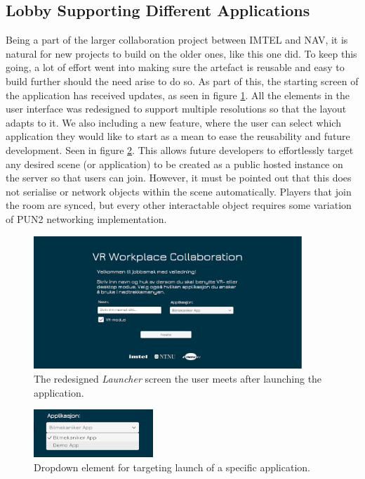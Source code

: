 \subsection{Lobby Supporting Different Applications}
\label{section:lobbySystem}
Being a part of the larger collaboration project between IMTEL and NAV, it is natural for new projects to build on the older ones, like this one did. To keep this going, a lot of effort went into making sure the artefact is reusable and easy to build further should the need arise to do so. As part of this, the starting screen of the application has received updates, as seen in figure \ref{fig:phase3_lobby1}. All the elements in the user interface was redesigned to support multiple resolutions so that the layout adapts to it.  
We also including a new feature, where the user can select which application they would like to start as a mean to ease the reusability and future development. Seen in figure \ref{fig:phase3_dropwdown}. This allows future developers to effortlessly target any desired scene (or application) to be created as a public hosted instance on the server so that users can join. 
However, it must be pointed out that this does not serialise or network objects within the scene automatically. Players that join the room are synced, but every other interactable object requires some variation of PUN2 networking implementation. 
    

\begin{figure}[H]
  \centering
   \captionsetup{width=.9\linewidth}
    \includegraphics[width=0.9\textwidth]{fig/phase_3/implementation/Lobby1.PNG}
 \caption{The redesigned \textit{Launcher} screen the user meets after launching the application.}
\label{fig:phase3_lobby1}
\end{figure}



\begin{figure}[H]
  \centering
   \captionsetup{width=.4\linewidth}
    \includegraphics[width=0.4\textwidth]{fig/phase_3/implementation/LauncherDropdown1.png}
 \caption{Dropdown element for targeting launch of a specific application. }
\label{fig:phase3_dropwdown}
\end{figure}

